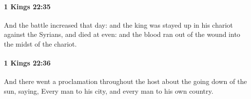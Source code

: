 		\paragraph{1 Kings 22:35} %
			\label{1KINGS-22-35}

			And the battle increased that day: and the king was stayed up in his chariot against the Syrians, and died at even: and the blood ran out of the wound into the midst of the chariot.


		\paragraph{1 Kings 22:36} %
			\label{1KINGS-22-36}

			And there went a proclamation throughout the host about the going down of the sun, saying, Every man to his city, and every man to his own country.



